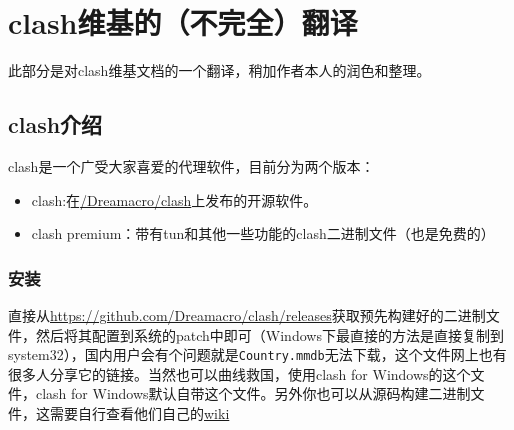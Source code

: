 \section{clash维基的（不完全）翻译}
此部分是对clash维基文档的一个翻译，稍加作者本人的润色和整理。
\subsection{clash介绍}
clash是一个广受大家喜爱的代理软件，目前分为两个版本：
\begin{itemize}
    \item clash:在\href{https://github.com/Dreamacro/clash}{/Dreamacro/clash}上发布的开源软件。
        \item clash premium：带有tun和其他一些功能的clash二进制文件（也是免费的）
    \end{itemize}

\subsubsection{安装}
    直接从\url{https://github.com/Dreamacro/clash/releases}获取预先构建好的二进制文件，然后将其配置到系统的patch中即可（Windows下最直接的方法是直接复制到system32），国内用户会有个问题就是\verb|Country.mmdb|无法下载，这个文件网上也有很多人分享它的链接。当然也可以曲线救国，使用clash for Windows的这个文件，clash for Windows默认自带这个文件。另外你也可以从源码构建二进制文件，这需要自行查看他们自己的\href{https://github.com/Dreamacro/clash/wiki}{wiki}